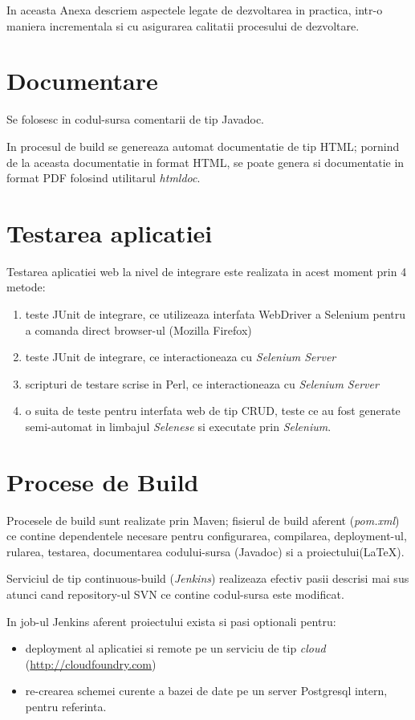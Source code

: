 In aceasta Anexa descriem aspectele legate de dezvoltarea in practica, intr-o
maniera incrementala si cu asigurarea calitatii procesului de dezvoltare.

\section{Documentare}
Se folosesc in codul-sursa comentarii de tip Javadoc. 

In procesul de build se genereaza automat documentatie de tip HTML;
pornind de la aceasta documentatie in format HTML, se poate genera si documentatie in format PDF 
folosind utilitarul \emph{htmldoc}.


\section{Testarea aplicatiei}
Testarea aplicatiei web la nivel de integrare este realizata in acest moment prin 4 metode:
\begin{enumerate}
\item
teste JUnit de integrare, ce utilizeaza interfata WebDriver a Selenium pentru a comanda direct browser-ul (Mozilla Firefox)
\item
teste JUnit de integrare, ce interactioneaza cu \emph{Selenium Server}
\item
scripturi de testare scrise in Perl, ce interactioneaza cu \emph{Selenium Server}
\item
o suita de teste pentru interfata web de tip CRUD, 
teste ce au fost generate semi-automat in limbajul \emph{Selenese} 
si executate prin \emph{Selenium}.
\end{enumerate}

\section{Procese de Build}
Procesele de build sunt realizate prin Maven;
fisierul de build aferent (\emph{pom.xml})
ce contine dependentele necesare pentru configurarea, compilarea,
deployment-ul, rularea, testarea, documentarea codului-sursa (Javadoc) si a proiectului(LaTeX).

Serviciul de tip continuous-build (\emph{Jenkins}) 
realizeaza efectiv pasii descrisi mai sus 
atunci cand repository-ul SVN ce contine codul-sursa este modificat. 

In job-ul Jenkins aferent proiectului exista si pasi optionali pentru:
\begin{itemize}
\item
deployment al aplicatiei si remote pe un
serviciu de tip \emph{cloud} (\url{http://cloudfoundry.com}) 
\item
re-crearea schemei curente a bazei de date pe un server Postgresql intern,
pentru referinta.
\end{itemize}

